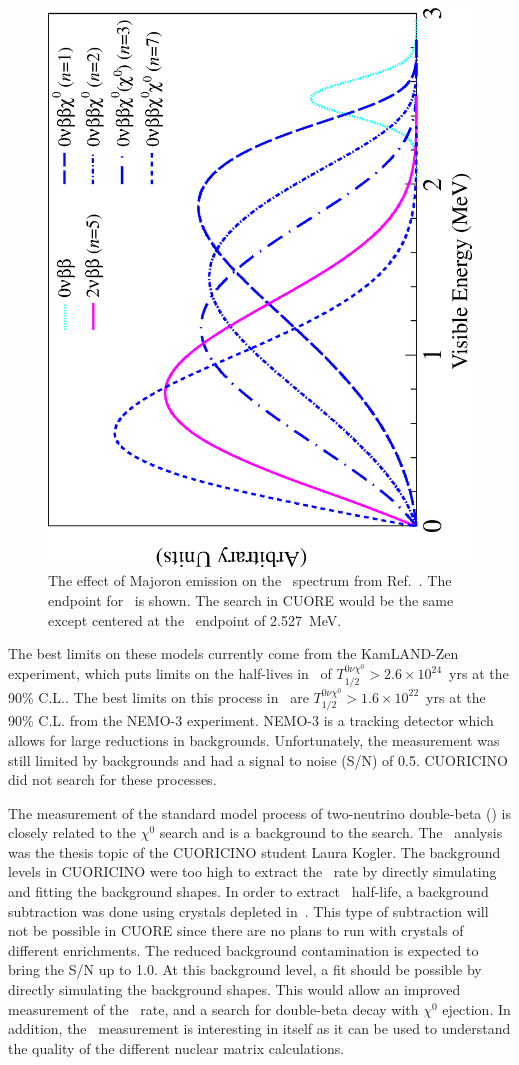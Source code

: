 \begin{figure}
\begin{center}
\includegraphics[angle=270, width=0.58\columnwidth]{fig1} 
\end{center}
\caption{\label{majoran}The effect of Majoron emission on the \zeronu~spectrum from Ref.~\cite{KZMaj}. The endpoint for \isoxe~is shown. The search in CUORE would be the same except centered at the \isomain~endpoint of 2.527~MeV. }
\end{figure}

The best limits on these models currently come from the KamLAND-Zen experiment, which puts limits on the half-lives in \isoxe~of $T_{1/2}^{0\nu\chi^0}>2.6\times10^{24}$~yrs at the 90\% C.L.\cite{KZMaj}. The best limits on this process in \isomain~are $T_{1/2}^{0\nu\chi^0}>1.6\times10^{22}$~yrs at the 90\% C.L. from the NEMO-3 experiment\cite{nemo3Te}. NEMO-3 is a tracking detector which allows for large reductions in backgrounds. Unfortunately, the measurement was still limited by backgrounds and had a signal to noise (S/N) of 0.5. CUORICINO did not search for these processes.

The measurement of the standard model process of two-neutrino double-beta (\twonu) is closely related to the $\chi^{0}$ search and is a background to the search. The \twonu~analysis was the thesis topic of the CUORICINO student Laura Kogler\cite{laura}. The background levels in CUORICINO were too high to extract the \twonu~rate by directly simulating and fitting the background shapes. In order to extract \twonu~half-life, a background subtraction was done using crystals depleted in~\isomain. This type of subtraction will not be possible in CUORE since there are no plans to run with crystals of different enrichments. The reduced background contamination is expected to bring the S/N up to 1.0. At this background level, a fit should be possible by directly simulating the background shapes. This would allow an improved measurement of the \twonu~rate, and a search for double-beta decay with $\chi^{0}$ ejection. In addition, the \twonu~measurement is interesting in itself as it can be used to understand the quality of the different nuclear matrix calculations. 

